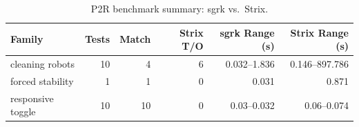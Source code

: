 \begin{table}[htbp]
\centering
\caption{P2R benchmark summary: sgrk vs.\ Strix.}
\label{tab:P2R_summary}
\begin{tabular}{l r r r r r}
\toprule
Family & Tests & Match & Strix T/O & sgrk Range (s) & Strix Range (s) \\
\midrule
cleaning robots & 10 & 4 & 6 & 0.032--1.836 & 0.146--897.786 \\
forced stability & 1 & 1 & 0 & 0.031 & 0.871 \\
responsive toggle & 10 & 10 & 0 & 0.03--0.032 & 0.06--0.074 \\
\bottomrule
\end{tabular}
\end{table}
